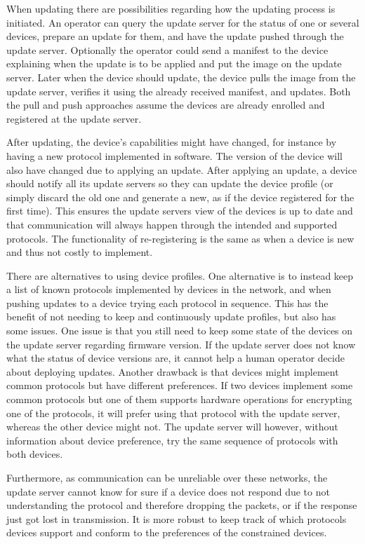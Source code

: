 \documentclass[0-thesis.tex]{subfiles}
\begin{document}
When updating there are possibilities regarding how the updating process is initiated. An
operator can query the update server for the status of one or several devices, prepare an
update for them, and have the update pushed through the update server. Optionally the
operator could send a manifest to the device explaining when the update is to be applied
and put the image on the update server. Later when the device should update, the device
pulls the image from the update server, verifies it using the already received manifest,
and updates. Both the pull and push approaches assume the devices are already enrolled and
registered at the update server.

After updating, the device's capabilities might have changed, for instance by having a new
protocol implemented in software. The version of the device will also have changed due to
applying an update. After applying an update, a device should notify all its update
servers so they can update the device profile (or simply discard the old one and generate
a new, as if the device registered for the first time). This ensures the update servers
view of the devices is up to date and that communication will always happen through the
intended and supported protocols. The functionality of re-registering is the same as when
a device is new and thus not costly to implement.

There are alternatives to using device profiles. One alternative is to instead keep a list
of known protocols implemented by devices in the network, and when pushing updates to a
device trying each protocol in sequence. This has the benefit of not needing to keep and
continuously update profiles, but also has some issues. One issue is that you still need
to keep some state of the devices on the update server regarding firmware version. If the
update server does not know what the status of device versions are, it cannot help a human
operator decide about deploying updates. Another drawback is that devices might implement
common protocols but have different preferences. If two devices implement some common
protocols but one of them supports hardware operations for encrypting one of the
protocols, it will prefer using that protocol with the update server, whereas the other
device might not. The update server will however, without information about device
preference, try the same sequence of protocols with both devices.

Furthermore, as communication can be unreliable over these networks, the update server
cannot know for sure if a device does not respond due to not understanding the protocol
and therefore dropping the packets, or if the response just got lost in transmission. It
is more robust to keep track of which protocols devices support and conform to the
preferences of the constrained devices.
\end{document}
